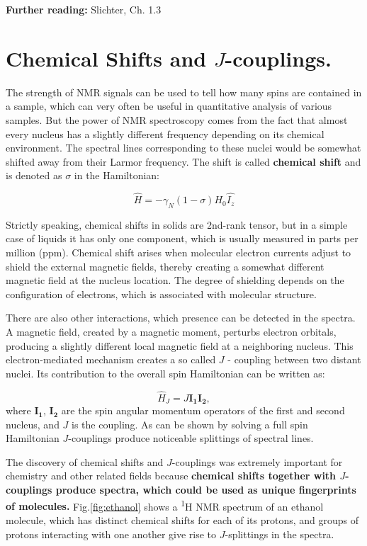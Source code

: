 \documentclass[a4paper, 12pt]{article}
\begin{document}
\textbf{Further reading:} Slichter, Ch. 1.3 

\section{Chemical Shifts and $J$-couplings.}
 The strength of NMR signals can be used to tell how many spins are contained in a sample, which can very often be useful in quantitative analysis of various samples. But the power of NMR spectroscopy comes from the fact that almost every nucleus has a slightly different frequency depending on its chemical environment. The spectral lines corresponding to these nuclei would be somewhat shifted away from their Larmor frequency. The shift is called \textbf{chemical shift} and is denoted as $\sigma$ in the Hamiltonian:

\begin{equation}
\hat{H} = -\gamma_N (1 - \sigma) H_0 \hat{I_z}
\end{equation}

Strictly speaking, chemical shifts in solids are 2nd-rank tensor, but in a simple case of liquids it has only one component, which is usually measured in parts per million (ppm). Chemical shift arises when molecular electron currents adjust to shield the external magnetic fields, thereby creating a somewhat different magnetic field at the nucleus location. The degree of shielding depends on the configuration of electrons, which is associated with molecular structure.

 There are also other interactions, which presence can be detected in the spectra. A magnetic field, created by a magnetic moment, perturbs electron orbitals, producing a slightly different local magnetic field at a neighboring nucleus. This electron-mediated mechanism creates a so called $J$ - coupling between two distant nuclei. Its contribution to the overall spin Hamiltonian can be written as:

\begin{equation}
\hat{H}_J = J \bm{I_1} \bm{I_2},
\end{equation}
where $\bm{I_1}$, $\bm{I_2}$ are the spin angular momentum operators of the first and second nucleus, and $J$ is the coupling. As can be shown by solving a full spin Hamiltonian $J$-couplings produce noticeable splittings of spectral lines.

  The discovery of chemical shifts and $J$-couplings was extremely important for chemistry and other related fields because \textbf{chemical shifts together with $J$-couplings produce spectra, which could be used as unique fingerprints of molecules.} Fig.\ref{fig:ethanol} shows a \textsuperscript{1}H NMR spectrum of an ethanol molecule, which has distinct chemical shifts for each of its protons, and groups of protons interacting with one another give rise to $J$-splittings in the spectra. 
  
\end{document}
